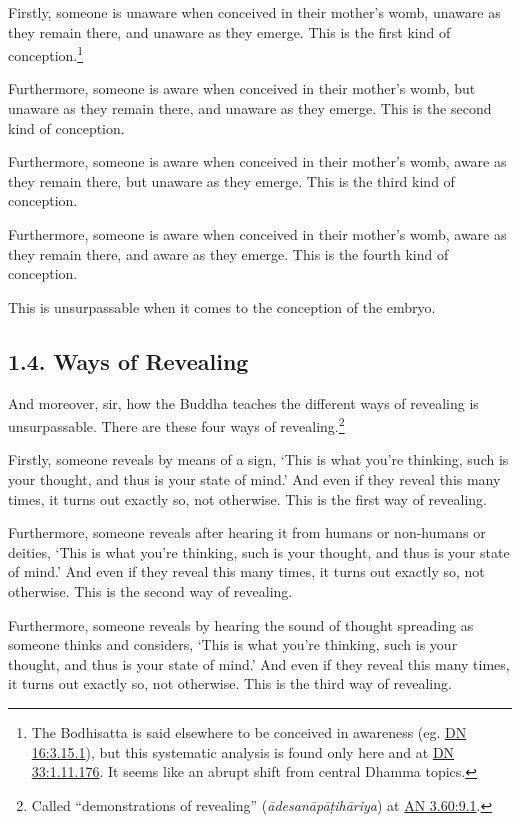 \documentclass[12pt,openany]{book}%
\begin{document}
Firstly, someone is unaware when conceived in their mother’s womb, unaware as they remain there, and unaware as they emerge. This is the first kind of conception.\footnote{The Bodhisatta is said elsewhere to be conceived in awareness (eg. \href{https://suttacentral.net/dn16/en/sujato\#3.15.1}{DN 16:3.15.1}), but this systematic analysis is found only here and at \href{https://suttacentral.net/dn33/en/sujato\#1.11.176}{DN 33:1.11.176}. It seems like an abrupt shift from central Dhamma topics. } 

Furthermore, someone is aware when conceived in their mother’s womb, but unaware as they remain there, and unaware as they emerge. This is the second kind of conception. 

Furthermore, someone is aware when conceived in their mother’s womb, aware as they remain there, but unaware as they emerge. This is the third kind of conception. 

Furthermore, someone is aware when conceived in their mother’s womb, aware as they remain there, and aware as they emerge. This is the fourth kind of conception. 

This is unsurpassable when it comes to the conception of the embryo. 

\subsection*{1.4. Ways of Revealing }

And moreover, sir, how the Buddha teaches the different ways of revealing is unsurpassable. There are these four ways of revealing.\footnote{Called “demonstrations of revealing” (\textit{\textsanskrit{ādesanāpāṭihāriya}}) at \href{https://suttacentral.net/an3.60/en/sujato\#9.1}{AN 3.60:9.1}. } 

Firstly, someone reveals by means of a sign, ‘This is what you’re thinking, such is your thought, and thus is your state of mind.’ And even if they reveal this many times, it turns out exactly so, not otherwise. This is the first way of revealing. 

Furthermore, someone reveals after hearing it from humans or non-humans or deities, ‘This is what you’re thinking, such is your thought, and thus is your state of mind.’ And even if they reveal this many times, it turns out exactly so, not otherwise. This is the second way of revealing. 

Furthermore, someone reveals by hearing the sound of thought spreading as someone thinks and considers, ‘This is what you’re thinking, such is your thought, and thus is your state of mind.’ And even if they reveal this many times, it turns out exactly so, not otherwise. This is the third way of revealing. 
\end{document}
